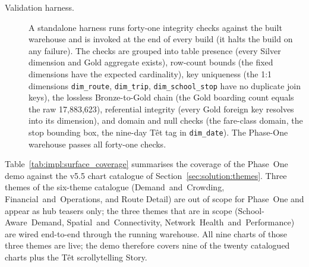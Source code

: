 \begin{description}
  \item[Validation harness.] A standalone harness runs forty-one
    integrity checks against the built warehouse and is invoked at the
    end of every build (it halts the build on any failure). The checks
    are grouped into table presence (every Silver dimension and Gold
    aggregate exists), row-count bounds (the fixed dimensions have the
    expected cardinality), key uniqueness (the 1:1 dimensions
    \texttt{dim\_route}, \texttt{dim\_trip}, \texttt{dim\_school\_stop}
    have no duplicate join keys), the lossless Bronze-to-Gold chain
    (the Gold boarding count equals the raw 17{,}883{,}623), referential
    integrity (every Gold foreign key resolves into its dimension),
    and domain and null checks (the fare-class domain, the stop bounding
    box, the nine-day T\^et tag in \texttt{dim\_date}). The Phase-One
    warehouse passes all forty-one checks.
\end{description}

Table~\ref{tab:impl:surface_coverage} summarises the coverage of the
Phase~One demo against the v5.5 chart catalogue of
Section~\ref{sec:solution:themes}. Three themes of the six-theme
catalogue (Demand~and~Crowding, Financial~and~Operations, and Route
Detail) are out of scope for Phase~One and appear as hub teasers only;
the three themes that are in scope (School-Aware~Demand,
Spatial~and~Connectivity, Network~Health~and~Performance) are wired
end-to-end through the running warehouse. All nine charts of those three
themes are live; the demo therefore covers nine of the twenty
catalogued charts plus the T\^et scrollytelling Story.

